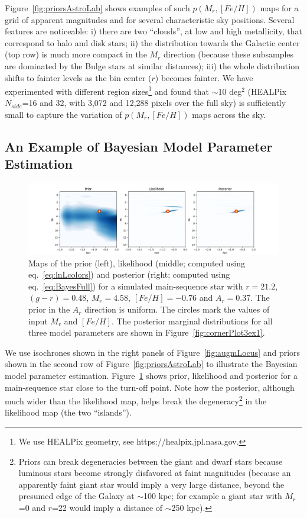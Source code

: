 Figure~\ref{fig:priorsAstroLab} shows examples of such $p(M_r, [Fe/H])$ maps for a grid of apparent magnitudes and for
several characteristic sky positions. Several features are noticeable: i) there are two ``clouds'', at low and high metallicity,
that correspond to halo and disk stars; ii) the distribution towards the Galactic center (top row) is much more compact in
the $M_r$ direction (because these subsamples are dominated by the Bulge stars at similar distances); iii) the whole 
distribution shifts to fainter levels as the bin center ($r$) becomes fainter. We have experimented with different region
sizes\footnote{We use HEALPix geometry, see https://healpix.jpl.nasa.gov.} and found that $\sim$10 deg$^2$
(HEALPix $N_{side}$=16 and 32, with 3,072 and 12,288 pixels over the full sky) is sufficiently small to capture the
variation of $p(M_r, [Fe/H])$ maps across the sky.
 
 
\subsection{An Example of Bayesian Model Parameter Estimation}


\begin{figure}[t!]
\hskip -0.7in
\includegraphics[width=1.2\textwidth,angle=0]{figures/bayesPanels_ex1.png}
\caption{Maps of the prior (left), likelihood (middle; computed using eq.~\ref{eq:lnLcolors}) and posterior (right;
computed using eq.~\ref{eq:BayesFull}) for a simulated main-sequence star with $r=21.2$, $(g-r)=0.48$,
$M_r= 4.58$, $[Fe/H]=-0.76$ and $A_r=0.37$. The prior in the $A_r$ direction is uniform. The circles mark
the values of input $M_r$ and $[Fe/H]$. The posterior marginal distributions for all three model parameters
are shown in Figure~\ref{fig:cornerPlot3ex1}.
}
\label{fig:bayesPanels}
\end{figure}
 
We use isochrones shown in the right panels of Figure~\ref{fig:augmLocus} and priors shown
in the second row of Figure~\ref{fig:priorsAstroLab} to illustrate the Bayesian model parameter estimation. 
Figure~\ref{fig:bayesPanels} shows prior, likelihood and posterior for a main-sequence star close to the
turn-off point. Note how the posterior, although much wider than the likelihood map, helps break the
degeneracy\footnote{Priors can break degeneracies between the giant and dwarf stars because luminous
stars become strongly disfavored at faint magnitudes (because an apparently faint giant star would imply
a very large distance, beyond the presumed edge of the Galaxy at $\sim$100 kpc; for example a giant star
with $M_r$=0 and $r$=22 would imply a distance of $\sim$250 kpc).} in the likelihood map (the two ``islands'').


